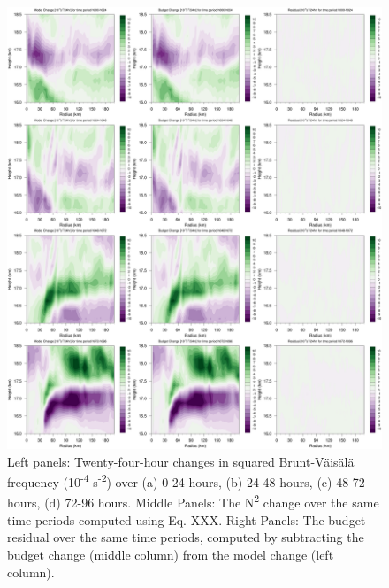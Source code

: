 \documentclass{ametsoc}
\begin{document}
\begin{figure}[ht]
\centerline{\includegraphics[width=33pc]{figures/fig03_R-Z_mod+bud+res.png}}
\caption{Left panels: Twenty-four-hour changes in squared Brunt-V{\"a}is{\"a}l{\"a} frequency (10\textsuperscript{-4} s\textsuperscript{-2}) over (a) 0-24 hours, (b) 24-48 hours, (c) 48-72 hours, (d) 72-96 hours. Middle Panels: The N\textsuperscript{2} change over the same time periods computed using Eq. XXX. Right Panels: The budget residual over the same time periods, computed by subtracting the budget change (middle column) from the model change (left column).}
\label{fig:modbudres}
\end{figure}
\end{document}
